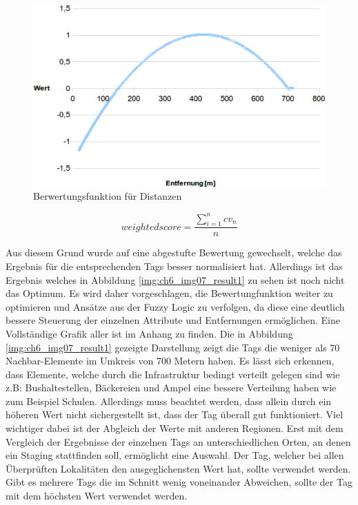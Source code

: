 \begin{figure}[H]
\begin{center}
\includegraphics[width=150mm]{images/ch6_img06_valued2.png}
\caption{Berwertungsfunktion für Distanzen}
\label{img:ch6_img06_valued2}
\end{center}
\end{figure}

\begin{equation}
weighted score = \frac{ \sum\limits_{i=1}^n cv_n }{n}
\end{equation}

Aus diesem Grund wurde auf eine abgestufte Bewertung gewechselt, welche das Ergebnis für die entsprechenden Tags besser normalisiert hat.
Allerdings ist das Ergebnis welches in Abbildung \ref{img:ch6_img07_result1} zu sehen ist noch nicht das Optimum. Es wird daher vorgeschlagen, die Bewertungfunktion weiter zu optimieren und Ansätze aus der Fuzzy Logic zu verfolgen, da diese eine deutlich bessere Steuerung der einzelnen Attribute und Entfernungen ermöglichen. Eine Vollständige Grafik aller ist im Anhang zu finden. Die in Abbildung \ref{img:ch6_img07_result1} gezeigte Darstellung zeigt die Tags die weniger als 70 Nachbar-Elemente im Umkreis von 700 Metern haben.
Es lässt sich erkennen, dass Elemente, welche durch die Infrastruktur bedingt verteilt gelegen sind wie z.B: Bushaltestellen, Bäckereien und Ampel eine bessere Verteilung haben wie zum Beispiel Schulen. Allerdings muss beachtet werden, dass allein durch ein höheren Wert nicht sichergestellt ist, dass der Tag überall gut funktioniert. Viel wichtiger dabei ist der Abgleich der Werte mit anderen Regionen. Erst mit dem Vergleich der Ergebnisse der einzelnen Tags an unterschiedlichen Orten, an denen ein Staging stattfinden soll, ermöglicht eine Auswahl.
Der Tag, welcher bei allen Überprüften Lokalitäten den ausgeglichensten Wert hat, sollte verwendet werden. Gibt es mehrere Tags die im Schnitt wenig voneinander Abweichen, sollte der Tag mit dem höchsten Wert verwendet werden. 

